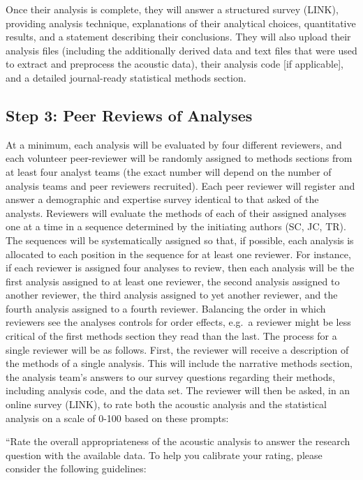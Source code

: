 \documentclass[
  english,
  man]{apa6}
\begin{document}
Once their analysis is complete, they will answer a structured survey (LINK), providing analysis technique, explanations of their analytical choices, quantitative results, and a statement describing their conclusions.
They will also upload their analysis files (including the additionally derived data and text files that were used to extract and preprocess the acoustic data), their analysis code {[}if applicable{]}, and a detailed journal-ready statistical methods section.

\hypertarget{step-3-peer-reviews-of-analyses}{%
\subsection{Step 3: Peer Reviews of Analyses}\label{step-3-peer-reviews-of-analyses}}

At a minimum, each analysis will be evaluated by four different reviewers, and each volunteer peer-reviewer will be randomly assigned to methods sections from at least four analyst teams (the exact number will depend on the number of analysis teams and peer reviewers recruited).
Each peer reviewer will register and answer a demographic and expertise survey identical to that asked of the analysts.
Reviewers will evaluate the methods of each of their assigned analyses one at a time in a sequence determined by the initiating authors (SC, JC, TR).
The sequences will be systematically assigned so that, if possible, each analysis is allocated to each position in the sequence for at least one reviewer.
For instance, if each reviewer is assigned four analyses to review, then each analysis will be the first analysis assigned to at least one reviewer, the second analysis assigned to another reviewer, the third analysis assigned to yet another reviewer, and the fourth analysis assigned to a fourth reviewer.
Balancing the order in which reviewers see the analyses controls for order effects, e.g.~a reviewer might be less critical of the first methods section they read than the last.
The process for a single reviewer will be as follows.
First, the reviewer will receive a description of the methods of a single analysis.
This will include the narrative methods section, the analysis team's answers to our survey questions regarding their methods, including analysis code, and the data set.
The reviewer will then be asked, in an online survey (LINK), to rate both the acoustic analysis and the statistical analysis on a scale of 0-100 based on these prompts:

``Rate the overall appropriateness of the acoustic analysis to answer the research question with the available data. To help you calibrate your rating, please consider the following guidelines:
\end{document}
